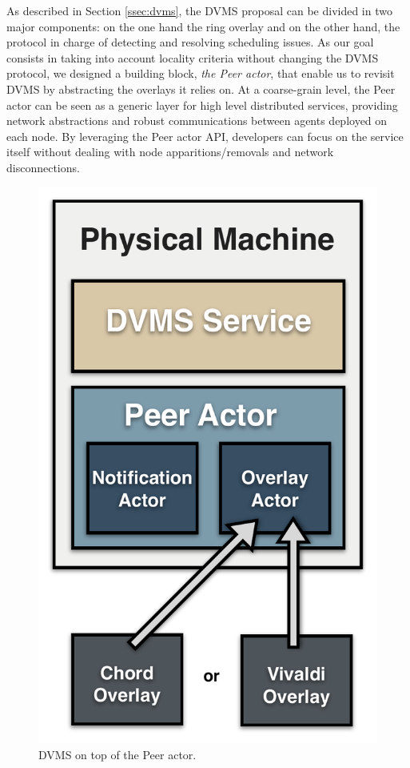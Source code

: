 As described in Section \ref{ssec:dvms}, the DVMS proposal can be divided in two major
components: on the one hand the ring overlay and on the other hand, the protocol in charge
of detecting and resolving scheduling issues. As our goal consists in taking into account
locality criteria without changing the DVMS protocol, we designed a building block, \ie
\emph{the Peer actor}, that enable us to revisit DVMS by abstracting the overlays it
relies on. At a coarse-grain level, the Peer actor can be seen as a generic layer for high
level distributed services, providing network abstractions and robust communications
between agents deployed on each node. By leveraging the Peer actor API, developers can
focus on the service itself without dealing with node apparitions/removals and network
disconnections.

\begin{figure}
\vspace{-.7cm}\hspace*{.2cm}
  \includegraphics[width=\linewidth]{Figures/DVMS.pdf}
  \caption{DVMS on top of the Peer actor.}%
  \label{fig:peeractor}%
\end{figure}

